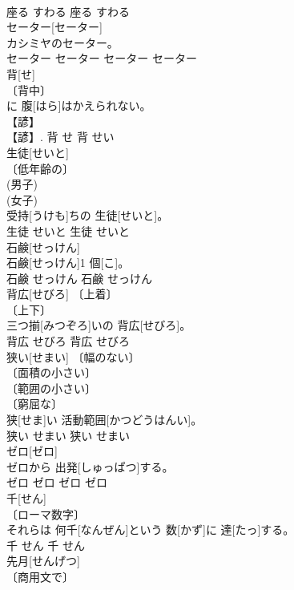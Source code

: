 \documentclass[8pt]{extreport}
\begin{document}
\begin{CJK}{UTF8}{min}
\\	座る	すわる	座る	すわる	
\\	セーター[セーター]	
\\	カシミヤのセーター。	
\\	セーター	セーター	セーター	セーター	
\\	背[せ]	
\\	〔背中〕 
\\	[⇒せなか 
\\	〔うしろ〕 
\\	〔身長〕 
\\	〔山の尾根〕 
\\	背[せ]に 腹[はら]はかえられない。	
\\	【諺】 
\\	【諺】.	背	せ	背	せい	
\\	生徒[せいと]	
\\	〔低年齢の〕 
\\	(男子) 
\\	(女子) 
\\	受持[うけも]ちの 生徒[せいと]。	
\\	生徒	せいと	生徒	せいと	
\\	石鹸[せっけん]	
\\	石鹸[せっけん]1 個[こ]。	
\\	石鹸	せっけん	石鹸	せっけん	
\\	背広[せびろ]	〔上着〕 
\\	〔上下〕 
\\	三つ揃[みつぞろ]いの 背広[せびろ]。	
\\	背広	せびろ	背広	せびろ	
\\	狭い[せまい]	〔幅のない〕 
\\	〔面積の小さい〕 
\\	〔範囲の小さい〕 
\\	〔窮屈な〕 
\\	狭[せま]い 活動範囲[かつどうはんい]。	
\\	狭い	せまい	狭い	せまい	
\\	ゼロ[ゼロ]	
\\	ゼロから 出発[しゅっぱつ]する。	
\\	ゼロ	ゼロ	ゼロ	ゼロ	
\\	千[せん]	
\\	〔ローマ数字〕 
\\	それらは 何千[なんぜん]という 数[かず]に 達[たっ]する。	
\\	千	せん	千	せん	
\\	先月[せんげつ]	
\\	〔商用文で〕 

\end{CJK}
\end{document}
